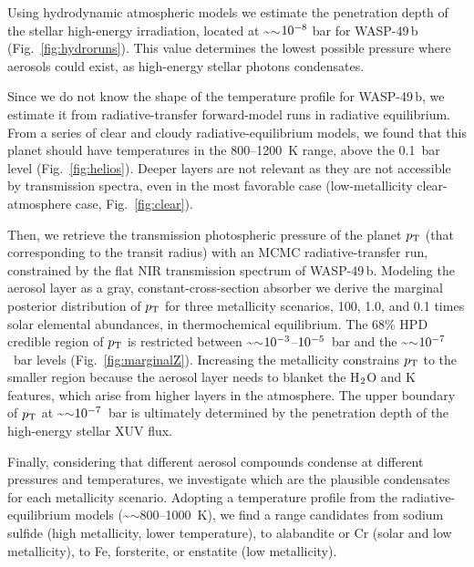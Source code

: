 \documentclass[tighten, times, twocolumn]{aastex61}  %
\let\oldsim=\sim
\renewcommand\sim{\ifmmode\oldsim\else\math{\oldsim}\fi}
\newcommand\ttt[1]{10\sp{#1}}
\renewcommand\math[1]{$#1$}
\let\oldmsp=\sp
\let\oldmsb=\sb
\def\sp#1{\ifmmode
           \oldmsp{#1}%
         \else\strut\raise.85ex\hbox{\scriptsize #1}\fi}
\def\sb#1{\ifmmode
           \oldmsb{#1}%
         \else\strut\raise-.54ex\hbox{\scriptsize #1}\fi}
\newcommand\water{H$\sb{2}$O}
\begin{document}
Using hydrodynamic atmospheric models we estimate the penetration
depth of the stellar high-energy irradiation, located at
{\sim}$\ttt{-8}$ bar for WASP-49\,b (Fig.~\ref{fig:hydroruns}).  This
value determines the lowest possible pressure where aerosols could
exist, as  high-energy stellar photons  condensates.

Since we do not know the shape of the temperature profile for WASP-49\,b, we
estimate it from radiative-transfer forward-model runs in radiative
equilibrium.  From a series of clear and cloudy radiative-equilibrium
models, we found that this planet should have temperatures in the
800--1200~K range, above the 0.1~bar level (Fig.~\ref{fig:helios}).
Deeper layers are not relevant as they are not accessible by
transmission spectra, even in the most favorable case (low-metallicity
clear-atmosphere case, Fig.~\ref{fig:clear}).

Then, we retrieve the transmission photospheric pressure of the planet
$p\sb{\rm T}$ (that corresponding to the transit radius) with an MCMC
radiative-transfer run, constrained by the flat NIR transmission
spectrum of WASP-49\,b.  Modeling the aerosol layer as a gray,
constant-cross-section absorber we derive the marginal posterior
distribution of $p\sb{\rm T}$ for three metallicity scenarios, 100,
1.0, and 0.1 times solar elemental abundances, in thermochemical
equilibrium.  The 68\% HPD credible region of $p\sb{\rm T}$ is
restricted between {\sim}$\ttt{-3}$--$\ttt{-5}$~bar and the
{\sim}$\ttt{-7}$~bar levels (Fig.~\ref{fig:marginalZ}).  Increasing
the metallicity constrains $p\sb{\rm T}$ to the smaller region because
the aerosol layer needs to blanket the {\water} and K features, which
arise from higher layers in the atmosphere.  The upper boundary of
$p\sb{\rm T}$ at {\sim}$\ttt{-7}$~bar is ultimately determined by the
penetration depth of the high-energy stellar XUV flux.

Finally, considering that different aerosol compounds condense at
different pressures and temperatures, we investigate which are the
plausible condensates for each metallicity scenario.  Adopting a
temperature profile from the radiative-equilibrium models
({\sim}800--1000~K), we find a range candidates from sodium sulfide
(high metallicity, lower temperature), to alabandite or Cr (solar and
low metallicity), to Fe, forsterite, or enstatite (low metallicity).
\end{document}
